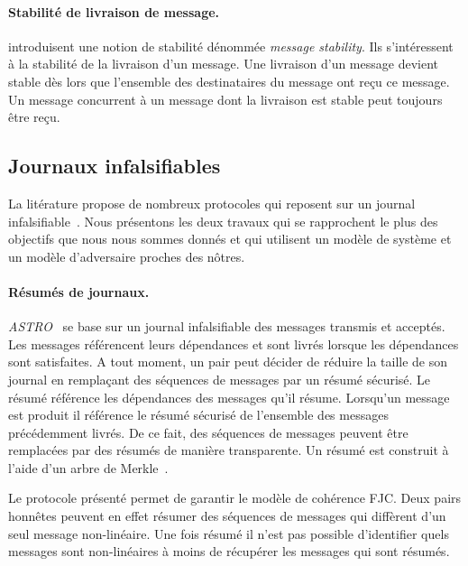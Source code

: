 \paragraph{Stabilité de livraison de message.} \textcite{birman_1991_causalmulticast} introduisent une notion de stabilité dénommée \emph{message stability}.
Ils s'intéressent à la stabilité de  la livraison d'un message.
Une livraison d'un message devient stable dès lors que l'ensemble des destinataires du message ont reçu ce message.
Un message concurrent à un message dont la livraison est stable peut toujours être reçu.


\subsection{Journaux infalsifiables}

La litérature propose de nombreux protocoles qui reposent sur un journal infalsifiable~\autocite{terry_bayou_1995,mahajan_astro_2008,mahajan_depot_2011,truong_authenticating_2012,kollmann2019_snapdoc}.
Nous présentons les deux travaux qui se rapprochent le plus des objectifs que nous nous sommes donnés et qui utilisent un modèle de système et un modèle d'adversaire proches des nôtres.


\paragraph{Résumés de journaux.} \emph{ASTRO}~\autocite{mahajan_astro_2008} se base sur un journal infalsifiable des messages transmis et acceptés.
Les messages référencent leurs dépendances et sont livrés lorsque les dépendances sont satisfaites.
A tout moment, un pair peut décider de réduire la taille de son journal en remplaçant des séquences de messages par un résumé sécurisé.
Le résumé référence les dépendances des messages qu'il résume.
Lorsqu'un message est produit il référence le résumé sécurisé de l'ensemble des messages précédemment livrés.
De ce fait, des séquences de messages peuvent être remplacées par des résumés de manière transparente.
Un résumé est construit à l'aide d'un arbre de Merkle~\autocite{merkle_1979_merkletree}.

Le protocole présenté permet de garantir le modèle de cohérence \acf{FJC}.
Deux pairs honnêtes peuvent en effet résumer des séquences de messages qui diffèrent d'un seul message non-linéaire.
Une fois résumé il n'est pas possible d'identifier quels messages sont non-linéaires à moins de récupérer les messages qui sont résumés.


